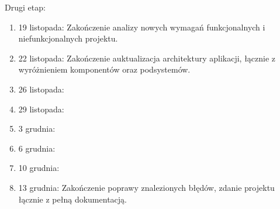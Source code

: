 \documentclass[10pt,a4paper]{article}
\begin{document}
Drugi etap:
\begin{enumerate}
	\item 19 listopada: Zakończenie analizy nowych wymagań funkcjonalnych i niefunkcjonalnych projektu.
	\item 22 listopada: Zakończenie auktualizacja architektury aplikacji, łącznie z wyróżnieniem komponentów oraz podsystemów.
	\item 26 listopada: 
	\item 29 listopada: 
	\item 3 grudnia: 
	\item 6 grudnia: 
	\item 10 grudnia: 
	\item 13 grudnia: Zakończenie poprawy znalezionych błędów, zdanie projektu łącznie z pełną dokumentacją.
\end{enumerate}
\end{document}
